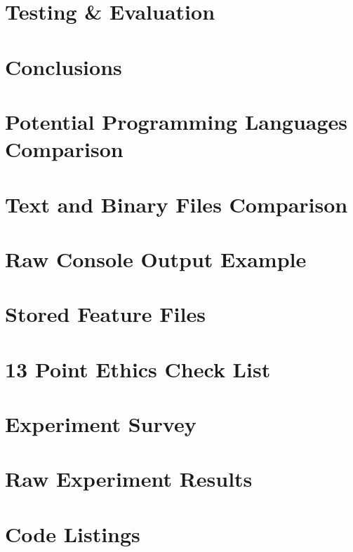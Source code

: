 \documentclass[11pt,openright,twoside,a4paper]{report}
\begin{document}
\chapter{Testing \& Evaluation}
\label{ch:chapter6}


\chapter{Conclusions}
\label{ch:chapter7}




\let\cleardoublepage\clearpage %
\appendix

\chapter{Potential Programming Languages Comparison}
\label{ch:appendix-comparison-programming-languages}


\chapter{Text and Binary Files Comparison}
\label{ch:appendix-comparison-text-vs-binary}


\chapter{Raw Console Output Example}
\label{ch:appendix-raw-console-output-example}


\chapter{Stored Feature Files}
\label{ch:appendix-stored-feature-files}


\chapter{13 Point Ethics Check List}
\label{ch:appendix-ethics-checklist}


\chapter{Experiment Survey}
\label{ch:appendix-experiment-survey}


\chapter{Raw Experiment Results}
\label{ch:appendix-survey-results}


\chapter{Code Listings}
\label{ch:appendix-code-listings}

\end{document}
